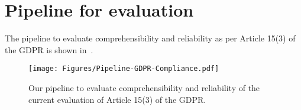 \appendix
\label{Sec:Appendix}
\section{Pipeline for evaluation}\label{app:piepline}
The pipeline to evaluate comprehensibility and reliability as per Article 15(3) of the GDPR is shown in~.
\label{app:pipeline}
\begin{figure}[h]
    \centering
    \texttt{[image: Figures/Pipeline-GDPR-Compliance.pdf]}
    \vspace{-2 mm}
    \caption{Our pipeline to evaluate comprehensibility and reliability of the current evaluation of Article 15(3) of the GDPR.}%
    \vspace{-2 mm}
    \label{Fig: Pipeline}
\end{figure}
\fi 

